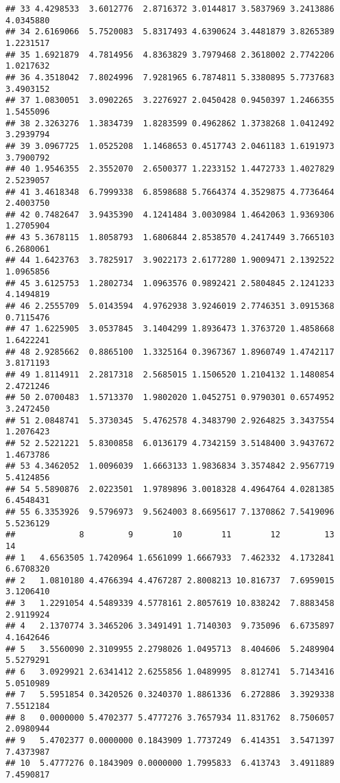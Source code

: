 \documentclass[
]{article}
\begin{document}
\begin{verbatim}
## 33 4.4298533  3.6012776  2.8716372 3.0144817 3.5837969 3.2413886 4.0345880
## 34 2.6169066  5.7520083  5.8317493 4.6390624 3.4481879 3.8265389 1.2231517
## 35 1.6921879  4.7814956  4.8363829 3.7979468 2.3618002 2.7742206 1.0217632
## 36 4.3518042  7.8024996  7.9281965 6.7874811 5.3380895 5.7737683 3.4903152
## 37 1.0830051  3.0902265  3.2276927 2.0450428 0.9450397 1.2466355 1.5455096
## 38 2.3263276  1.3834739  1.8283599 0.4962862 1.3738268 1.0412492 3.2939794
## 39 3.0967725  1.0525208  1.1468653 0.4517743 2.0461183 1.6191973 3.7900792
## 40 1.9546355  2.3552070  2.6500377 1.2233152 1.4472733 1.4027829 2.5239057
## 41 3.4618348  6.7999338  6.8598688 5.7664374 4.3529875 4.7736464 2.4003750
## 42 0.7482647  3.9435390  4.1241484 3.0030984 1.4642063 1.9369306 1.2705904
## 43 5.3678115  1.8058793  1.6806844 2.8538570 4.2417449 3.7665103 6.2680061
## 44 1.6423763  3.7825917  3.9022173 2.6177280 1.9009471 2.1392522 1.0965856
## 45 3.6125753  1.2802734  1.0963576 0.9892421 2.5804845 2.1241233 4.1494819
## 46 2.2555709  5.0143594  4.9762938 3.9246019 2.7746351 3.0915368 0.7115476
## 47 1.6225905  3.0537845  3.1404299 1.8936473 1.3763720 1.4858668 1.6422241
## 48 2.9285662  0.8865100  1.3325164 0.3967367 1.8960749 1.4742117 3.8171193
## 49 1.8114911  2.2817318  2.5685015 1.1506520 1.2104132 1.1480854 2.4721246
## 50 2.0700483  1.5713370  1.9802020 1.0452751 0.9790301 0.6574952 3.2472450
## 51 2.0848741  5.3730345  5.4762578 4.3483790 2.9264825 3.3437554 1.2076423
## 52 2.5221221  5.8300858  6.0136179 4.7342159 3.5148400 3.9437672 1.4673786
## 53 4.3462052  1.0096039  1.6663133 1.9836834 3.3574842 2.9567719 5.4124856
## 54 5.5890876  2.0223501  1.9789896 3.0018328 4.4964764 4.0281385 6.4548431
## 55 6.3353926  9.5796973  9.5624003 8.6695617 7.1370862 7.5419096 5.5236129
##             8         9        10        11        12         13         14
## 1   4.6563505 1.7420964 1.6561099 1.6667933  7.462332  4.1732841  6.6708320
## 2   1.0810180 4.4766394 4.4767287 2.8008213 10.816737  7.6959015  3.1206410
## 3   1.2291054 4.5489339 4.5778161 2.8057619 10.838242  7.8883458  2.9119924
## 4   2.1370774 3.3465206 3.3491491 1.7140303  9.735096  6.6735897  4.1642646
## 5   3.5560090 2.3109955 2.2798026 1.0495713  8.404606  5.2489904  5.5279291
## 6   3.0929921 2.6341412 2.6255856 1.0489995  8.812741  5.7143416  5.0510989
## 7   5.5951854 0.3420526 0.3240370 1.8861336  6.272886  3.3929338  7.5512184
## 8   0.0000000 5.4702377 5.4777276 3.7657934 11.831762  8.7506057  2.0980944
## 9   5.4702377 0.0000000 0.1843909 1.7737249  6.414351  3.5471397  7.4373987
## 10  5.4777276 0.1843909 0.0000000 1.7995833  6.413743  3.4911889  7.4590817

\end{verbatim}
\end{document}
